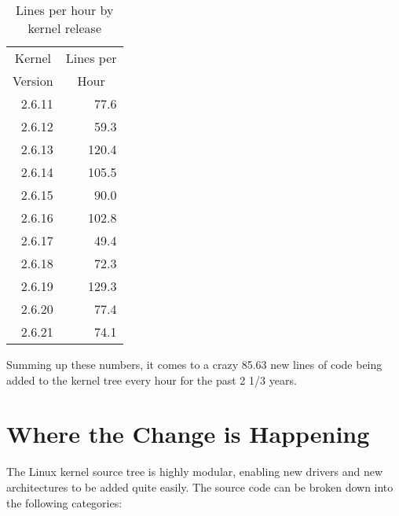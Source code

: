 \documentclass[final]{ols}
\begin{document}
\begin{table}[tbph]
\begin{center}
\begin{tabular}{|r|r|}
\hline
\multicolumn{1}{|c|}{Kernel} & \multicolumn{1}{|c|}{Lines per}\\
\multicolumn{1}{|c|}{Version} & \multicolumn{1}{|c|}{Hour}\\
\hline
\hline
\rule[-0.1ex]{0pt}{2.5ex}2.6.11	& 77.6\hspace*{1ex}		\\
2.6.12	& 59.3\hspace*{1ex}		\\
2.6.13	& 120.4\hspace*{1ex}		\\
2.6.14	& 105.5\hspace*{1ex}		\\
2.6.15	& 90.0\hspace*{1ex}		\\
2.6.16	& 102.8\hspace*{1ex}		\\
2.6.17	& 49.4\hspace*{1ex}		\\
2.6.18	& 72.3\hspace*{1ex}		\\
2.6.19	& 129.3\hspace*{1ex}		\\
2.6.20	& 77.4\hspace*{1ex}		\\
2.6.21	& 74.1\hspace*{1ex}		\\
\hline
\end{tabular}
\caption{Lines per hour by kernel release}
\label{gkh-lines-per-hour}
\end{center}
\end{table}


Summing up these numbers, it comes to a crazy 85.63 new lines of code
being added to the kernel tree every hour for the past 2 1/3 years.

\section{Where the Change is Happening}

The Linux kernel source tree is highly modular, enabling new drivers and
new architectures to be added quite easily.  The source code can be
broken down into the following categories:
\end{document}
